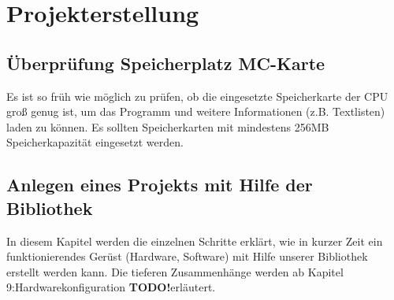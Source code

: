 \chapter{Projekterstellung}\label{chap:Projekterstellung}

\section{Überprüfung Speicherplatz MC-Karte}\label{subsec:Überprüfung Speicherplatz MC-Karte}

Es ist so früh wie möglich zu prüfen, ob die eingesetzte Speicherkarte der CPU groß genug ist, um das Programm und weitere Informationen (z.B. Textlisten) laden zu können. Es sollten Speicherkarten mit mindestens 256MB Speicherkapazität eingesetzt werden.

\clearpage
\section{Anlegen eines Projekts mit Hilfe der Bibliothek}\label{subsec:Anlegen eines Projekts mit Hilfe der Bibliothek}

In diesem Kapitel werden die einzelnen Schritte erklärt, wie in kurzer Zeit ein funktionierendes Gerüst (Hardware, Software) mit Hilfe unserer Bibliothek erstellt werden kann.
Die tieferen Zusammenhänge werden ab Kapitel 9:Hardwarekonfiguration \textbf{TODO!}erläutert.

